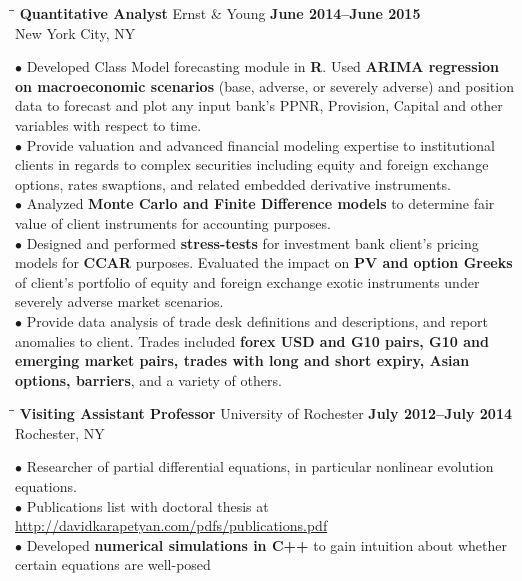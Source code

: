 \documentclass{resume}
\begin{document}
\begin{resume}
\begin{tabbing}
\hspace{2.3in}\= \hspace{2.6in}\= \kill
{\bf Quantitative Analyst} \> Ernst \& Young   
\>\textbf{June 2014--June 2015 } \\
    \>New York City, NY 
\end{tabbing}
$\bullet$
Developed Class Model forecasting module in \textbf{R}. Used
\textbf{ARIMA regression \\ on macroeconomic scenarios} (base, adverse, or severely adverse) and position data to forecast and plot any input bank’s PPNR,
Provision, Capital and other variables with respect to time.  \\
$\bullet$ Provide valuation and advanced financial modeling expertise to
institutional clients in regards to complex securities including equity and
foreign exchange options, rates swaptions, and related embedded derivative
instruments.  \\
$\bullet$ 
Analyzed \textbf{Monte Carlo and Finite Difference models} to determine fair value of
client instruments for accounting purposes.  \\
$\bullet$ Designed and performed \textbf{stress-tests} for investment bank
client’s pricing models for \textbf{CCAR} purposes. Evaluated the impact on
\textbf{PV and option Greeks} of client’s portfolio of equity and foreign exchange exotic instruments under severely adverse market scenarios. 
\\
$\bullet$
Provide data analysis of trade desk definitions and descriptions, and report
anomalies to client. Trades included \textbf{forex USD and G10 pairs, G10 and
	emerging market pairs, trades with long and short expiry, Asian options,
barriers}, and a variety of others.
\begin{tabbing}
\hspace{2.3in}\= \hspace{2.6in}\= \kill
{\bf Visiting Assistant Professor} \>University of Rochester     
\>\textbf{July 2012--July 2014} \\
    \>Rochester, NY 
\end{tabbing}
$\bullet$ Researcher of partial differential equations, in particular nonlinear evolution equations.  
\\
$\bullet$ Publications list with doctoral thesis at \url{http://davidkarapetyan.com/pdfs/publications.pdf}
\\
$\bullet$ Developed \textbf{numerical simulations in C++}  to gain
intuition about whether certain  equations are well-posed

\end{resume}
\end{document}
